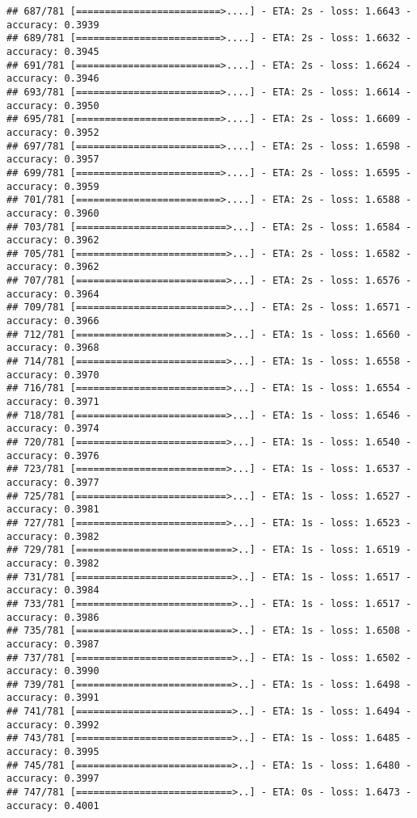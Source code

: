 \documentclass[
]{article}
\begin{document}
\begin{verbatim}
## 687/781 [=========================>....] - ETA: 2s - loss: 1.6643 - accuracy: 0.3939
## 689/781 [=========================>....] - ETA: 2s - loss: 1.6632 - accuracy: 0.3945
## 691/781 [=========================>....] - ETA: 2s - loss: 1.6624 - accuracy: 0.3946
## 693/781 [=========================>....] - ETA: 2s - loss: 1.6614 - accuracy: 0.3950
## 695/781 [=========================>....] - ETA: 2s - loss: 1.6609 - accuracy: 0.3952
## 697/781 [=========================>....] - ETA: 2s - loss: 1.6598 - accuracy: 0.3957
## 699/781 [=========================>....] - ETA: 2s - loss: 1.6595 - accuracy: 0.3959
## 701/781 [=========================>....] - ETA: 2s - loss: 1.6588 - accuracy: 0.3960
## 703/781 [==========================>...] - ETA: 2s - loss: 1.6584 - accuracy: 0.3962
## 705/781 [==========================>...] - ETA: 2s - loss: 1.6582 - accuracy: 0.3962
## 707/781 [==========================>...] - ETA: 2s - loss: 1.6576 - accuracy: 0.3964
## 709/781 [==========================>...] - ETA: 2s - loss: 1.6571 - accuracy: 0.3966
## 712/781 [==========================>...] - ETA: 1s - loss: 1.6560 - accuracy: 0.3968
## 714/781 [==========================>...] - ETA: 1s - loss: 1.6558 - accuracy: 0.3970
## 716/781 [==========================>...] - ETA: 1s - loss: 1.6554 - accuracy: 0.3971
## 718/781 [==========================>...] - ETA: 1s - loss: 1.6546 - accuracy: 0.3974
## 720/781 [==========================>...] - ETA: 1s - loss: 1.6540 - accuracy: 0.3976
## 723/781 [==========================>...] - ETA: 1s - loss: 1.6537 - accuracy: 0.3977
## 725/781 [==========================>...] - ETA: 1s - loss: 1.6527 - accuracy: 0.3981
## 727/781 [==========================>...] - ETA: 1s - loss: 1.6523 - accuracy: 0.3982
## 729/781 [===========================>..] - ETA: 1s - loss: 1.6519 - accuracy: 0.3982
## 731/781 [===========================>..] - ETA: 1s - loss: 1.6517 - accuracy: 0.3984
## 733/781 [===========================>..] - ETA: 1s - loss: 1.6517 - accuracy: 0.3986
## 735/781 [===========================>..] - ETA: 1s - loss: 1.6508 - accuracy: 0.3987
## 737/781 [===========================>..] - ETA: 1s - loss: 1.6502 - accuracy: 0.3990
## 739/781 [===========================>..] - ETA: 1s - loss: 1.6498 - accuracy: 0.3991
## 741/781 [===========================>..] - ETA: 1s - loss: 1.6494 - accuracy: 0.3992
## 743/781 [===========================>..] - ETA: 1s - loss: 1.6485 - accuracy: 0.3995
## 745/781 [===========================>..] - ETA: 1s - loss: 1.6480 - accuracy: 0.3997
## 747/781 [===========================>..] - ETA: 0s - loss: 1.6473 - accuracy: 0.4001

\end{verbatim}
\end{document}
